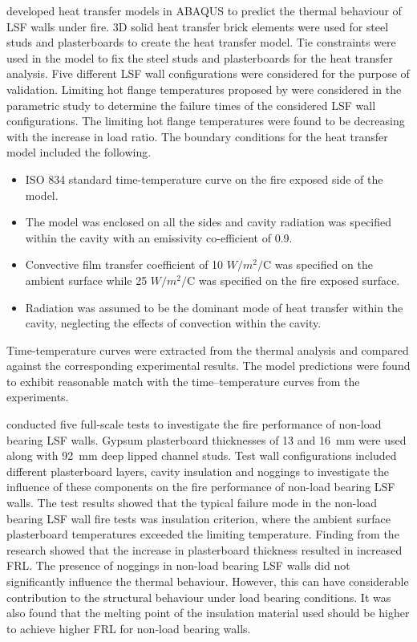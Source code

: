 \citet{Rusthi2017} developed heat transfer models in ABAQUS to predict the thermal behaviour of LSF walls under fire. 3D solid heat transfer brick elements were used for steel studs and plasterboards to create the heat transfer model. Tie constraints were used in the model to fix the steel studs and plasterboards for the heat transfer analysis. Five different LSF wall configurations were considered for the purpose of validation. Limiting hot flange temperatures proposed by \citet{Gunalan2013e,Ariyanayagam2014e} were considered in the parametric study to determine the failure times of the considered LSF wall configurations. The limiting hot flange temperatures were found to be decreasing with the increase in load ratio. The boundary conditions for the heat transfer model included the following.
\begin{itemize}
	\item ISO 834 standard time-temperature curve on the fire exposed side of the model.
	\item The model was enclosed on all the sides and cavity radiation was specified within the cavity with an emissivity co-efficient of 0.9.
	\item Convective film transfer coefficient of 10 $W/m^2/$\degree C was specified on the ambient surface while 25 $W/m^2/$\degree C was specified on the fire exposed surface.
	\item Radiation was assumed to be the dominant mode of heat transfer within the cavity, neglecting the effects of convection within the cavity.
\end{itemize}
Time-temperature curves were extracted from the thermal analysis and compared against the corresponding experimental results. The model predictions were found to exhibit reasonable match with the time–temperature curves from the experiments.

\citet{Ariyanayagam2018a} conducted five full-scale tests to investigate the fire performance of non-load bearing LSF walls. Gypsum plasterboard thicknesses of 13 and 16~mm were used along with 92~mm deep lipped channel studs. Test wall configurations included different plasterboard layers, cavity insulation and noggings to investigate the influence of these components on the fire performance of non-load bearing LSF walls. The test results showed that the typical failure mode in the non-load bearing LSF wall fire tests was insulation criterion, where the ambient surface plasterboard temperatures exceeded the limiting temperature. Finding from the research showed that the increase in plasterboard thickness resulted in increased FRL. The presence of noggings in non-load bearing LSF walls did not significantly influence the thermal behaviour. However, this can have considerable contribution to the structural behaviour under load bearing conditions. It was also found that the melting point of the insulation material used should be higher to achieve higher FRL for non-load bearing walls. 


